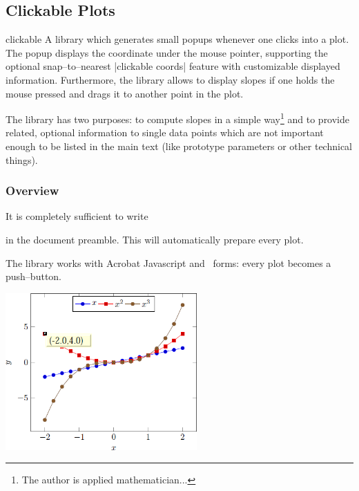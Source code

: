 \subsection{Clickable Plots}
\begin{pgfplotslibrary}{clickable}
	A library which generates small popups whenever one clicks into a plot. The popup displays the coordinate under the mouse pointer, supporting the optional snap--to--nearest |clickable coords| feature with customizable displayed information. Furthermore, the library allows to display slopes if one holds the mouse pressed and drags it to another point in the plot.

	The library has two purposes: to compute slopes in a simple way\footnote{The author is applied mathematician...} and to provide related, optional information to single data points which are not important enough to be listed in the main text (like prototype parameters or other technical things).
\end{pgfplotslibrary}


\subsubsection{Overview}
	It is completely sufficient to write 
\begin{codeexample}
\end{codeexample}
	\noindent in the document preamble. This will automatically prepare every plot.

	The library works with Acrobat Javascript and \pdf\ forms: every plot becomes a push--button. 

	\includegraphics[height=6cm]{figures/pgfplotsclickable-fig1.png}
	\hfill

